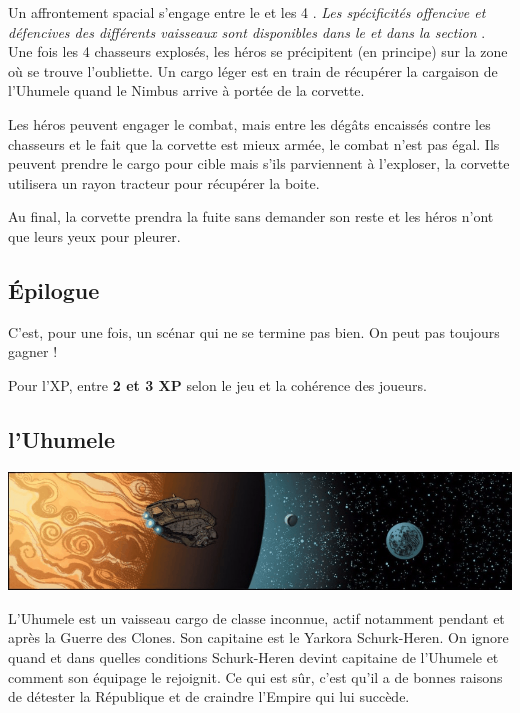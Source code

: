 Un affrontement spacial s’engage entre le  et les 4 . \textit{Les spécificités offencive et défencives des différents vaisseaux sont disponibles dans le  et dans la section }.\\

Une fois les 4 chasseurs explosés, les héros se précipitent (en principe) sur la zone où se trouve l’oubliette. Un cargo léger est en train de récupérer la cargaison de l’Uhumele quand le Nimbus arrive à portée de la corvette.

Les héros peuvent engager le combat, mais entre les dégâts encaissés contre les chasseurs et le fait que la corvette est mieux armée, le combat n’est pas égal. Ils peuvent prendre le cargo pour cible mais s’ils parviennent à l’exploser, la corvette utilisera un rayon tracteur pour récupérer la boite.

Au final, la corvette prendra la fuite sans demander son reste et les héros n’ont que leurs yeux pour pleurer.

\subsection{\'Epilogue}
C’est, pour une fois, un scénar qui ne se termine pas bien. On peut pas toujours gagner !

Pour l’XP, entre \textbf{2 et 3 XP} selon le jeu et la cohérence des joueurs.

\clearpage
\subsection{l’Uhumele}\label{sec:uhumele}
\noindent\includegraphics[width=\textwidth]{_img/uhumele-pano.png}

L'Uhumele est un vaisseau cargo de classe inconnue, actif notamment pendant et après la Guerre des Clones. Son capitaine est le Yarkora Schurk-Heren. On ignore quand et dans quelles conditions Schurk-Heren devint capitaine de l’Uhumele et comment son équipage le rejoignit. Ce qui est sûr, c’est qu’il a de bonnes raisons de détester la République et de craindre l’Empire qui lui succède.

